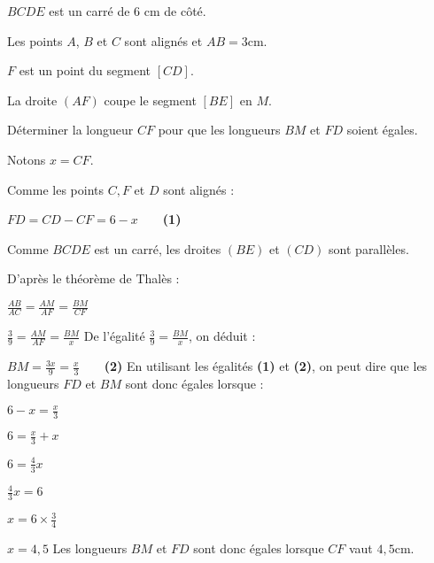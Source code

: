 \par
$BCDE$ est un carré de $6$ cm de côté.
\par
Les points $A$, $B$ et $C$ sont alignés et $AB=3$cm.
\par
$F$ est un point du segment $\left[CD\right]$.
\par
La droite $\left(AF\right)$ coupe le segment $\left[BE\right]$ en $M$.
\par
Déterminer la longueur $CF$ pour que les longueurs $BM$ et $FD$ soient égales.
\begin{corrige}
     Notons $x=CF$.
     \par
     Comme les points $C, F$ et $D$ sont alignés :
     \par
     $FD=CD-CF=6-x     \qquad     $\textbf{(1)}
     \par
     Comme $BCDE$ est un carré, les droites $\left(BE\right)$ et $\left(CD\right)$ sont parallèles.
     \par
     D'après le théorème de Thalès :
     \par
     $\frac{AB}{AC}=\frac{AM}{AF}=\frac{BM}{CF}$
     \par
     $\frac{3}{9}=\frac{AM}{AF}=\frac{BM}{x}$
     \medskip
     De l'égalité $\frac{3}{9}=\frac{BM}{x}$, on déduit :
     \par
     $BM=\frac{3x}{9}=\frac{x}{3}  \qquad     $\textbf{(2)}
     \medskip
     En utilisant les égalités \textbf{(1)} et \textbf{(2)}, on peut dire que les longueurs $FD$ et $BM$ sont donc égales lorsque :
     \par
     $6-x=\frac{x}{3}$
     \par
     $6=\frac{x}{3}+x$
     \par
     $6=\frac{4}{3}x$
     \par
     $\frac{4}{3}x=6$
     \par
     $x=6\times \frac{3}{4}$
     \par
     $x=4,5$
     \medskip
     Les longueurs $BM$ et $FD$ sont donc égales lorsque  $CF$ vaut $4,5$cm.
\end{corrige}
